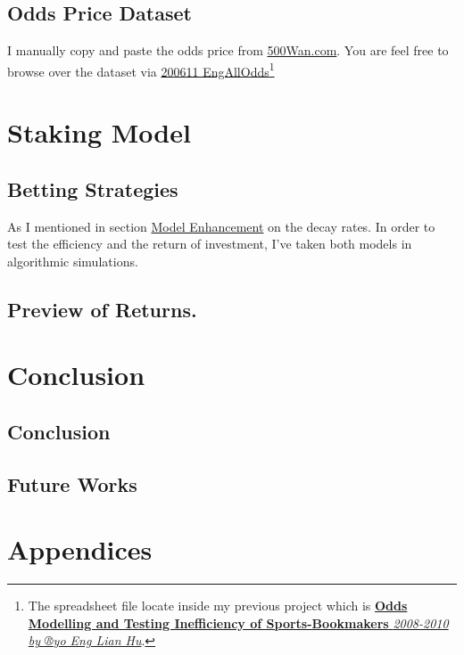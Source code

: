 \documentclass[article]{jss}
\begin{document}
\subsection{Odds Price Dataset}\label{odds-price-dataset}

I manually copy and paste the odds price from \href{}{500Wan.com}. You
are feel free to browse over the dataset via
\href{200611\%20EngAllOdds}{200611 EngAllOdds}\footnote{The spreadsheet
  file locate inside my previous project which is
  \href{https://www.dropbox.com/home/Research\%20Project\%202}{\textbf{Odds
  Modelling and Testing Inefficiency of Sports-Bookmakers}
  \emph{2008-2010 by ®yo Eng Lian Hu}}.}

\section{Staking Model}\label{staking-model}

\subsection{Betting Strategies}\label{betting-strategies}

As I mentioned in section \protect\hyperlink{model-enhancement}{Model
Enhancement} on the decay rates. In order to test the efficiency and the
return of investment, I've taken both models in algorithmic simulations.

\subsection{Preview of Returns.}\label{preview-of-returns.}

\section{Conclusion}\label{conclusion}

\subsection{Conclusion}\label{conclusion-1}

\subsection{Future Works}\label{future-works}

\section{Appendices}\label{appendices}
\end{document}

